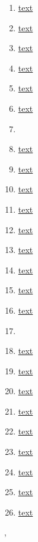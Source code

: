 \documentclass[11pt]{article}
\renewcommand{\today}{\shortmonthname[\the\month] \the \day,  \the\year}
\begin{document}
\begin{enumerate}
	\item \href{URL}{text}	%
	\item \href{URL}{text}	%
	\item \href{URL}{text}	%
	\item \href{URL}{text}	%
	\item \href{URL}{text}	%
	\item \href{URL}{text}	%
	\item \href{URL}{}	%
	\item \href{URL}{text}	%
	\item \href{URL}{text}	%
	\item \href{URL}{text}	%
	\item \href{URL}{text}	%
	\item \href{URL}{text}	%
	\item \href{URL}{text}	%
	\item \href{URL}{text}	%
	\item \href{URL}{text}	%
	\item \href{URL}{text}	%
	\item \href{URL}{}	%
	\item \href{URL}{text}	%
	\item \href{URL}{text}	%
	\item \href{URL}{text}	%
	\item \href{URL}{text}	%
	\item \href{URL}{text}	%
	\item \href{URL}{text}	%
	\item \href{URL}{text}	%
	\item \href{URL}{text}	%
	\item \href{URL}{text}	%
\end{enumerate}


%
\begin{flushright}
	\tiny \today 
\end{flushright}
\end{document}
